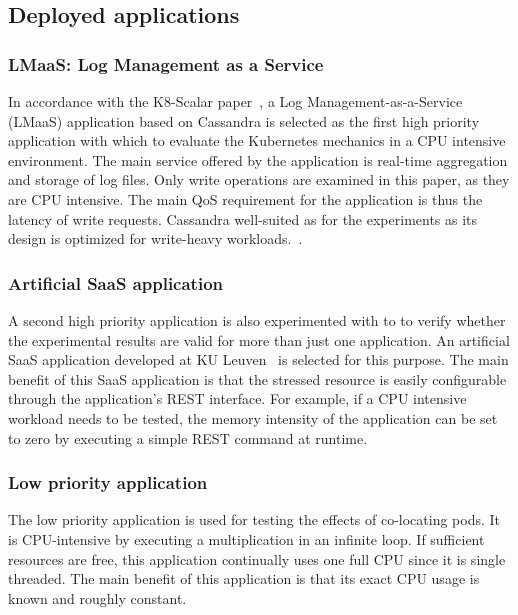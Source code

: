 \subsection{Deployed applications}
\label{test-apps}

\subsubsection{LMaaS: Log Management as a Service}
In accordance with the K8-Scalar paper~\citep{scalar}, a Log Management-as-a-Service (LMaaS) application based on Cassandra is selected as the first high priority application with which to evaluate the Kubernetes mechanics in a CPU intensive environment. The main service offered by the application is real-time aggregation and storage of log files. Only write operations are examined in this paper, as they are CPU intensive. The main QoS requirement for the application is thus the latency of write requests. Cassandra well-suited as for the experiments as its design is optimized for write-heavy workloads.~\citep{scalar}.

\subsubsection{Artificial SaaS application}
\label{setup:saas-app}
A second high priority application is also experimented with to to verify whether the experimental results are valid for more than just one application. An artificial SaaS application developed at KU Leuven~\citep{saas-app} is selected for this purpose. The main benefit of this SaaS application is that the stressed resource is easily configurable through the application's REST interface. For example, if a CPU intensive workload needs to be tested, the memory intensity of the application can be set to zero by executing a simple REST command at runtime. 

\subsubsection{Low priority application}
\label{setup:lpp}
The low priority application is used for testing the effects of co-locating pods. It is CPU-intensive by executing a multiplication in an infinite loop. If sufficient resources are free, this application continually uses one full CPU since it is single threaded. The main benefit of this application is that its exact CPU usage is known and roughly constant.
